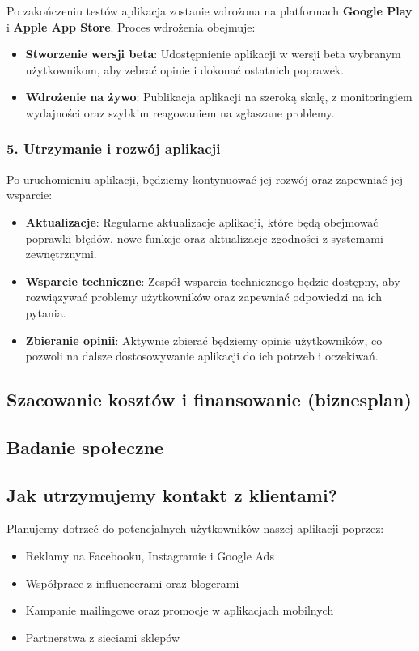 \documentclass[12pt,a4paper]{article}
\begin{document}
Po zakończeniu testów aplikacja zostanie wdrożona na platformach \textbf{Google Play} i
\textbf{Apple App Store}. Proces wdrożenia obejmuje:
\begin{itemize}
    \item \textbf{Stworzenie wersji beta}: Udostępnienie aplikacji w wersji beta wybranym
        użytkownikom, aby zebrać opinie i dokonać ostatnich poprawek.
    \item \textbf{Wdrożenie na żywo}: Publikacja aplikacji na szeroką skalę, z monitoringiem
        wydajności oraz szybkim reagowaniem na zgłaszane problemy.
\end{itemize}

\subsubsection*{5. Utrzymanie i rozwój aplikacji}

Po uruchomieniu aplikacji, będziemy kontynuować jej rozwój oraz zapewniać jej wsparcie:
\begin{itemize}
    \item \textbf{Aktualizacje}: Regularne aktualizacje aplikacji, które będą obejmować poprawki
        błędów, nowe funkcje oraz aktualizacje zgodności z systemami zewnętrznymi.
    \item \textbf{Wsparcie techniczne}: Zespół wsparcia technicznego będzie dostępny, aby
        rozwiązywać problemy użytkowników oraz zapewniać odpowiedzi na ich pytania.
    \item \textbf{Zbieranie opinii}: Aktywnie zbierać będziemy opinie użytkowników, co pozwoli na
        dalsze dostosowywanie aplikacji do ich potrzeb i oczekiwań.
\end{itemize}

\subsection*{Szacowanie kosztów i finansowanie (biznesplan)}

\subsection*{Badanie społeczne}

\subsection*{Jak utrzymujemy kontakt z klientami?}

Planujemy dotrzeć do potencjalnych użytkowników naszej aplikacji poprzez:
\begin{itemize}
    \item Reklamy na Facebooku, Instagramie i Google Ads
    \item Współprace z influencerami oraz blogerami
    \item Kampanie mailingowe oraz promocje w aplikacjach mobilnych
    \item Partnerstwa z sieciami sklepów
\end{itemize}
\end{document}
